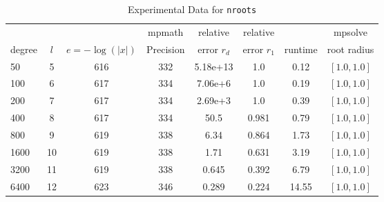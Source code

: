 \documentclass[sigconf]{acmart}
\begin{document}
\begin{table}[t]
\caption{Experimental Data for \texttt{nroots}} %
\label{tab:nroots}
\vskip -0.15in
\begin{center}
\begin{small}
\begin{sc}
\begin{tabular}{lccccccc}
\toprule
&  &  & mpmath & relative  & relative &  & mpsolve \\
degree  & $l$& $e=-\log(|x|)$& Precision &error $r_d$       & error $r_1$ &runtime& root radius\\
\midrule

 50 & 5 & 616 & 332 & 5.18e+13 & 1.0 & 0.12 & $[1.0, 1.0]$\\
 100 & 6 & 617 & 334 & 7.06e+6 & 1.0 & 0.19 & $[1.0, 1.0]$\\
 200 & 7 & 617 & 334 & 2.69e+3 & 1.0 & 0.39 & $[1.0, 1.0]$\\
 400 & 8 & 617 & 334 & 50.5 & 0.981 & 0.79 & $[1.0, 1.0]$\\
 800 & 9 & 619 & 338 & 6.34 & 0.864 & 1.73 & $[1.0, 1.0]$\\
 1600 & 10 & 619 & 338 & 1.71 & 0.631 & 3.19 & $[1.0, 1.0]$\\
 3200 & 11 & 619 & 338 & 0.645 & 0.392 & 6.79 & $[1.0, 1.0]$\\
 6400 & 12 & 623 & 346 & 0.289 & 0.224 & 14.55 & $[1.0, 1.0]$\\
\bottomrule
\end{tabular}
\end{sc}
\end{small}
\end{center}
\vskip 0.05in
\end{table}
\end{document}
